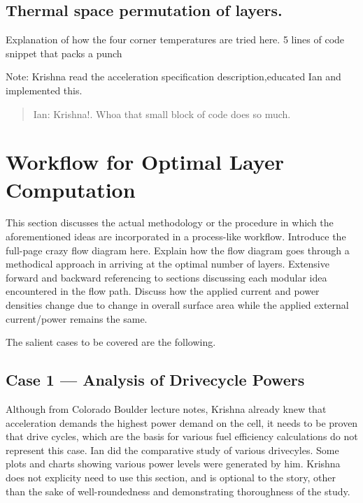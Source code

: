\subsection{Thermal space permutation of layers.}
Explanation of how the four corner temperatures are tried here. 5 lines of code snippet that packs a punch

Note: Krishna read the acceleration specification description,educated Ian and implemented this.

\begin{quotation}
Ian: Krishna!. Whoa that small block of code does so much.
\end{quotation}

\section{Workflow for Optimal Layer Computation}

This section discusses the actual methodology or the procedure in which the
aforementioned ideas are incorporated in a process-like workflow. Introduce the
full-page crazy flow diagram here. Explain how the flow diagram goes through a
methodical approach in arriving at the optimal number of layers. Extensive
forward and backward referencing to sections discussing each modular idea
encountered in the flow path. Discuss how the applied current and power
densities change due to change in overall surface area while the applied
external current/power remains the same.


The salient cases to be covered are the following.

\subsection{Case 1 --- Analysis of Drivecycle Powers}

Although from Colorado Boulder lecture notes, Krishna already knew that
acceleration demands the highest power demand on the cell, it needs to be proven
that drive cycles, which are the basis for various fuel efficiency calculations
do not represent this case. Ian did the comparative study of various drivecyles.
Some plots and charts showing various power levels were generated by him.
Krishna does not explicity need to use this section, and is optional to the
story, other than the sake of well-roundedness and demonstrating thoroughness of
the study.

